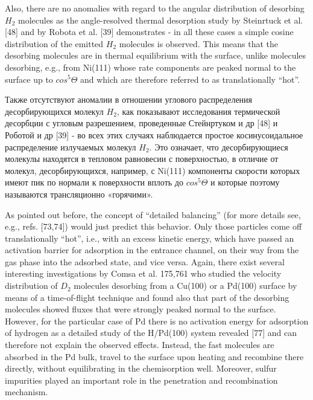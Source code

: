 \documentclass[11pt]{article}
\begin{document}
Also, there are no anomalies with regard to the angular distribution of
desorbing \(H_2\) molecules as the angle-resolved thermal desorption
study by Steinrtuck et al. {[}48{]} and by Robota et al. {[}39{]}
demonstrates - in all these cases a simple cosine distribution of the
emitted \(H_2\) molecules is observed. This means that the desorbing
molecules are in thermal equilibrium with the surface, unlike molecules
desorbing, e.g., from Ni(111) whose rate components are peaked normal to
the surface up to \(cos^5 \Theta\) and which are therefore referred to
as translationally ``hot''.

Также отсутствуют аномалии в отношении углового распределения
десорбирующихся молекул \(H_2\), как показывают исследования термической
десорбции с угловым разрешением, проведенные Стейнртуком и др {[}48{]} и
Роботой и др {[}39{]} - во всех этих случаях наблюдается простое
косинусоидальное распределение излучаемых молекул \(H_2\). Это означает,
что десорбирующиеся молекулы находятся в тепловом равновесии с
поверхностью, в отличие от молекул, десорбирующихся, например, с Ni(111)
компоненты скорости которых имеют пик по нормали к поверхности вплоть до
\(cos^5 \Theta\) и которые поэтому называются трансляционно «горячими».

As pointed out before, the concept of ``detailed balancing'' (for more
details see, e.g., refs. {[}73,74{]}) would just predict this behavior.
Only those particles come off translationally ``hot'', i.e., with an
excess kinetic energy, which have passed an activation barrier for
adsorption in the entrance channel, on their way from the gas phase into
the adsorbed state, and vice versa. Again, there exist several
interesting investigations by Comsa et al. 175,761 who studied the
velocity distribution of \(D_2\) molecules desorbing from a Cu(100) or a
Pd(100) surface by means of a time-of-flight technique and found also
that part of the desorbing molecules showed fluxes that were strongly
peaked normal to the surface. However, for the particular case of Pd
there is no activation energy for adsorption of hydrogen as a detailed
study of the H/Pd(100) system revealed {[}77{]} and can therefore not
explain the observed effects. Instead, the fast molecules are absorbed
in the Pd bulk, travel to the surface upon heating and recombine there
directly, without equilibrating in the chemisorption well. Moreover,
sulfur impurities played an important role in the penetration and
recombination mechanism.
\end{document}
